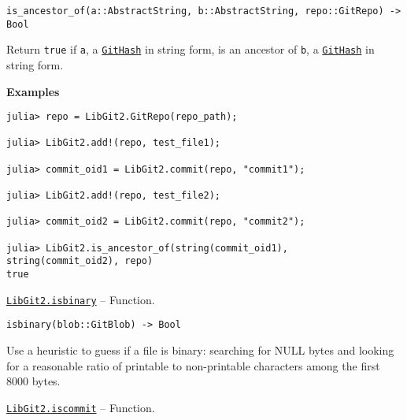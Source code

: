 \begin{adjustwidth}{2em}{0pt}


\begin{verbatim}
is_ancestor_of(a::AbstractString, b::AbstractString, repo::GitRepo) -> Bool
\end{verbatim}

Return \texttt{true} if \texttt{a}, a \hyperlink{202290709580230708}{\texttt{GitHash}} in string form, is an ancestor of \texttt{b}, a \hyperlink{202290709580230708}{\texttt{GitHash}} in string form.

\textbf{Examples}


\begin{verbatim}
julia> repo = LibGit2.GitRepo(repo_path);

julia> LibGit2.add!(repo, test_file1);

julia> commit_oid1 = LibGit2.commit(repo, "commit1");

julia> LibGit2.add!(repo, test_file2);

julia> commit_oid2 = LibGit2.commit(repo, "commit2");

julia> LibGit2.is_ancestor_of(string(commit_oid1), string(commit_oid2), repo)
true
\end{verbatim}



\end{adjustwidth}
\hypertarget{404822283933661526}{}
\hyperlink{404822283933661526}{\texttt{LibGit2.isbinary}}  -- {Function.}

\begin{adjustwidth}{2em}{0pt}


\begin{verbatim}
isbinary(blob::GitBlob) -> Bool
\end{verbatim}

Use a heuristic to guess if a file is binary: searching for NULL bytes and looking for a reasonable ratio of printable to non-printable characters among the first 8000 bytes.



\end{adjustwidth}
\hypertarget{12031902939660672720}{}
\hyperlink{12031902939660672720}{\texttt{LibGit2.iscommit}}  -- {Function.}


